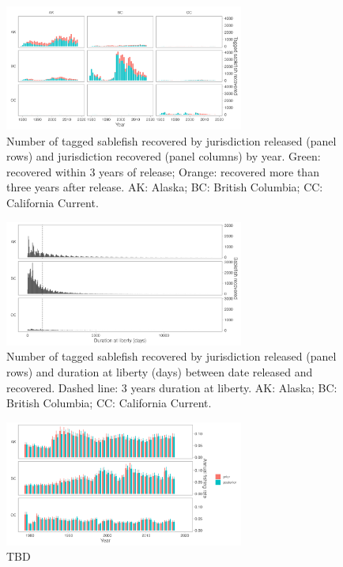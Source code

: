\documentclass{article}
\begin{document}
\begin{figure}[htb]
    \centering
    \includegraphics[width = 0.7\textwidth]{bar-regions-3-recovered-by-year}
    \caption{Number of tagged sablefish recovered by jurisdiction released (panel rows) and jurisdiction recovered (panel columns) by year. Green: recovered within 3 years of release; Orange: recovered more than three years after release. AK: Alaska; BC: British Columbia; CC: California Current.}
    \label{fig:bar-regions-3-recovered-by-year}
\end{figure}

\begin{figure}[htb]
    \centering
    \includegraphics[width = 0.7\textwidth]{bar-regions-3-duration-at-liberty}
    \caption{Number of tagged sablefish recovered by jurisdiction released (panel rows) and duration at liberty (days) between date released and recovered. Dashed line: 3 years duration at liberty. AK: Alaska; BC: British Columbia; CC: California Current.}
    \label{fig:bar-regions-3-duration-at-liberty}
\end{figure}

\begin{figure}[htb]
    \centering
    \includegraphics[width = 0.7\textwidth]{bar-regions-3-fishing-priors-posteriors}
    \caption{TBD}
    \label{fig:bar-regions-3-fishing-priors-posteriors}
\end{figure}
\end{document}
